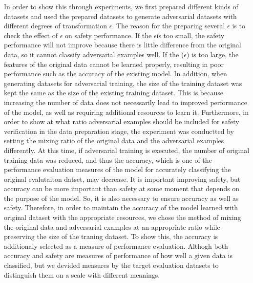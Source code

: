 \documentclass[journal,article,submit,moreauthors,pdftex]{Definitions/mdpi}
\begin{document}
In order to show this through experiments, we first prepared different kinds of datasets and used the prepared datasets to generate adversarial datasets with different degrees of transformation \begin{math}\epsilon\end{math}.
The reason for the preparing several \begin{math}\epsilon\end{math} is to check the effect of \begin{math}\epsilon\end{math} on safety performance. If the \begin{math}\epsilon\end{math}is too small, the safety performance will not improve because there is little difference from the original data, so it cannot classify adversarial examples well. If the (\begin{math}\epsilon\end{math}) is too large, the features of the original data cannot be learned properly, resulting in poor performance such as the accuracy of the existing model.
In addition, when generating datasets for adversarial training, the size of the training dataset was kept the same as the size of the existing training dataset.
This is because increasing the number of data does not necessarily lead to improved performance of the model, as well as requiring additional resources to learn it.
Furthermore, in order to show at what ratio adversarial examples should be included for safety verification in the data preparation stage, the experiment was conductted by setting the mixing ratio of the original data and the adversarial examples differently.
At this time, if adversarial training is executed, the number of original training data was reduced, and thus the accuracy, which is one of the performance evaluation measures of the model for accurately classifying the original evalutaiton datset, may decrease.
It is important improving safety, but accuracy can be more important than safety at some moment that depends on the purpose of the model. So, it is also necessary to ensure accuracy as well as safety. 
Therefore, in order to maintain the accuracy of the model learned with original dataset with the appropriate resources, we chose the method of mixing the original data and adversarial examples at an appropriate ratio while preserving the size of the traning dataset.
To show this, the accuracy is additionaly selected as a measure of performance evaluation.
Althogh both accuracy and safety are measures of performance of how well a given data is classified, but we devided measures by the target evaluation datasets to distinguish them on a scale with different meanings.
\end{document}
